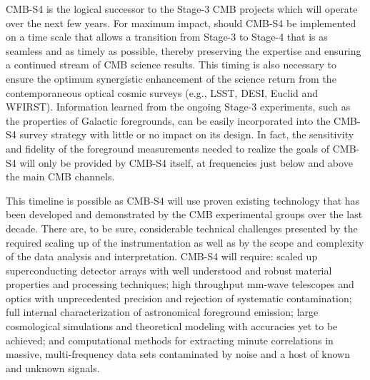 %


CMB-S4 is the logical successor to the Stage-3 CMB projects which will operate over the next few years. For maximum impact, should CMB-S4 be implemented on a time scale that allows a transition from Stage-3 to Stage-4 that is as seamless and as timely as possible, thereby preserving the expertise and ensuring a continued stream of CMB science results. This timing is also necessary to ensure the optimum synergistic enhancement of the science return from the contemporaneous optical cosmic surveys (e.g., LSST, DESI, Euclid and WFIRST).   Information learned from the ongoing Stage-3 experiments, such as the properties of Galactic foregrounds, can be easily incorporated into the CMB-S4 survey strategy with little or no impact on its design. In fact, the sensitivity and fidelity of the foreground measurements needed to realize the goals of CMB-S4 will only be provided by CMB-S4 itself, at frequencies just below and above the main CMB channels.

This timeline is possible as CMB-S4 will use proven existing technology that has been developed and demonstrated by the CMB experimental groups over the last decade. There are, to be sure, considerable technical challenges presented by the required scaling up of the instrumentation as well as by the scope and complexity of the data analysis and interpretation.  CMB-S4 will require: scaled up superconducting detector arrays with well understood and robust material properties and processing techniques; high throughput mm-wave telescopes and optics with unprecedented precision and rejection of systematic contamination; full internal characterization of astronomical foreground emission; large cosmological simulations and theoretical modeling with accuracies yet to be achieved; and computational methods for extracting minute correlations in massive, multi-frequency data sets contaminated by noise and a host of known and unknown signals. 


